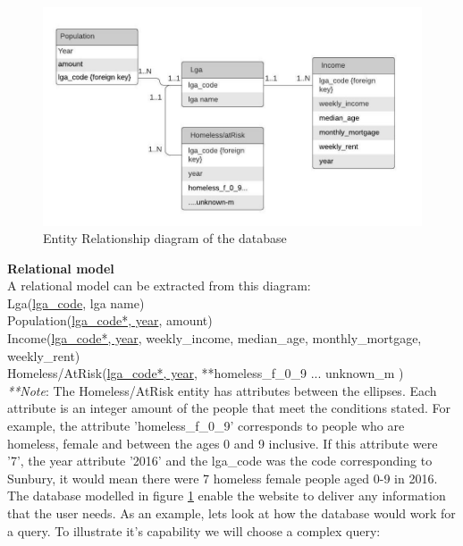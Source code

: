 \documentclass[12pt, a4paper]{article}
\begin{document}
\begin{figure}[h]
\centering
\includegraphics[scale=1]{ERDiagram.jpg} 
\caption{Entity Relationship diagram of the database}
\label{fig:erdiagram}
\end{figure}

\textbf{Relational model}\\
A relational model can be extracted from this diagram:\\
Lga(\underline{lga\_code}, lga name)\\
Population(\underline{lga\_code*, year}, amount)\\
Income(\underline{lga\_code*, year}, weekly\_income, median\_age, monthly\_mortgage, weekly\_rent)\\
Homeless/AtRisk(\underline{lga\_code*, year}, **homeless\_f\_0\_9 ... unknown\_m )\\

\emph{**Note}: The Homeless/AtRisk entity has attributes between the ellipses. Each attribute is an integer amount of the people that meet the conditions stated. For example, the attribute 'homeless\_f\_0\_9' corresponds to people who are homeless, female and between the ages 0 and 9 inclusive. If this attribute were '7', the year attribute '2016' and the lga\_code was the code corresponding to Sunbury, it would mean there were 7 homeless female people aged 0-9 in 2016.\\

The database modelled in figure \ref{fig:erdiagram} enable the website to deliver any information that the user needs. As an example, lets look at how the database would work for a query. To illustrate it's capability we will choose a complex query:
\end{document}

